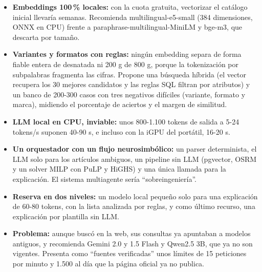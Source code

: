 \begin{tcolorbox}[colback=responsecolor, title=Insights de Gemini, colframe=gray!60!black, breakable]
	\begin{itemize}
		\item \textbf{Embeddings 100\,\% locales:} con la cuota gratuita, vectorizar el catálogo inicial llevaría semanas. Recomienda multilingual-e5-small (384 dimensiones, ONNX en CPU) frente a paraphrase-multilingual-MiniLM y bge-m3, que descarta por tamaño.

		\item \textbf{Variantes y formatos con reglas:} ningún embedding separa de forma fiable entera de desnatada ni 200 g de 800 g, porque la tokenización por subpalabras fragmenta las cifras. Propone una búsqueda híbrida (el vector recupera los 30 mejores candidatos y las reglas SQL filtran por atributos) y un banco de 200-300 casos con tres negativos difíciles (variante, formato y marca), midiendo el porcentaje de aciertos y el margen de similitud.

		\item \textbf{LLM local en CPU, inviable:} unos 800-1.100 tokens de salida a 5-24 tokens/s suponen 40-90 s, e incluso con la iGPU del portátil, 16-20 s.

		\item \textbf{Un orquestador con un flujo neurosimbólico:} un parser determinista, el LLM solo para los artículos ambiguos, un pipeline sin LLM (pgvector, OSRM y un solver MILP con PuLP y HiGHS) y una única llamada para la explicación. El sistema multiagente sería ``sobreingeniería''.

		\item \textbf{Reserva en dos niveles:} un modelo local pequeño solo para una explicación de 60-80 tokens, con la lista analizada por reglas, y como último recurso, una explicación por plantilla sin LLM.

		\item \textbf{Problema:} aunque buscó en la web, sus consultas ya apuntaban a modelos antiguos, y recomienda Gemini 2.0 y 1.5 Flash y Qwen2.5 3B, que ya no son vigentes. Presenta como ``fuentes verificadas'' unos límites de 15 peticiones por minuto y 1.500 al día que la página oficial ya no publica.
	\end{itemize}
\end{tcolorbox}

